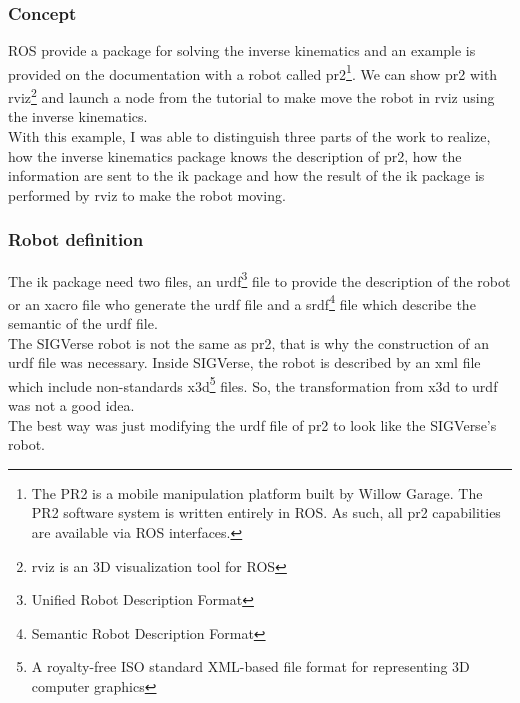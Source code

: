 \subsubsection{Concept}
ROS provide a package for solving the inverse kinematics and an example is provided on the documentation with a robot called pr2\footnote{The PR2 is a mobile manipulation platform built by Willow Garage. The PR2 software system is written entirely in ROS. As such, all pr2 capabilities are available via ROS interfaces.}. We can show pr2 with rviz\footnote{rviz is an 3D visualization tool for ROS} and launch a node from the tutorial to make move the robot in rviz using the inverse kinematics.\\
With this example, I was able to distinguish three parts of the work to realize, how the inverse kinematics package knows the description of pr2, how the information are sent to the ik package and how the result of the ik package is performed by rviz to make the robot moving. 

\subsubsection{Robot definition}
The ik package need two files, an urdf\footnote{Unified Robot Description Format} file to provide the description of the robot or an xacro file who generate the urdf file and a srdf\footnote{Semantic Robot Description Format} file which describe the semantic of the urdf file.\\

The SIGVerse robot is not the same as pr2, that is why the construction of an urdf file was necessary. Inside SIGVerse, the robot is described by an xml file which include non-standards x3d\footnote{A royalty-free ISO standard XML-based file format for representing 3D computer graphics} files. So, the transformation from x3d to urdf was not a good idea.\\
The best way was just modifying the urdf file of pr2 to look like the SIGVerse's robot.\\

